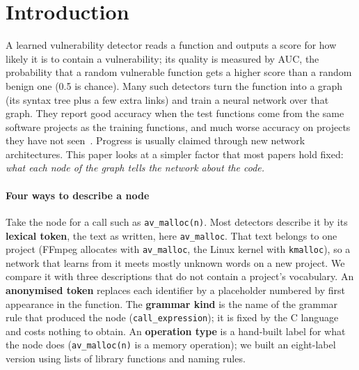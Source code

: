 \section{Introduction}

A learned vulnerability detector reads a function and outputs a score for how
likely it is to contain a vulnerability; its quality is measured by AUC, the
probability that a random vulnerable function gets a higher score than a random
benign one (0.5 is chance). Many such detectors turn the function
into a graph (its syntax tree plus a few extra links) and train a neural
network over that graph. They report good accuracy when the test functions come
from the same software projects as the training functions, and much worse
accuracy on projects they have not seen~\cite{chakraborty2022deep,
chakraborty2024realvul, ding2025primevul}. Progress is usually claimed through
new network architectures. This paper looks at a simpler factor that most
papers hold fixed: \emph{what each node of the graph tells the network about the
code.}

\paragraph{Four ways to describe a node} Take the node for a call such as
\texttt{av\_malloc(n)}. Most detectors describe it by its \textbf{lexical
token}, the text as written, here \texttt{av\_malloc}. That text belongs to one
project (FFmpeg allocates with \texttt{av\_malloc}, the Linux kernel with
\texttt{kmalloc}), so a network that learns from it meets mostly unknown words
on a new project. We compare it with three descriptions that do not contain a
project's vocabulary. An \textbf{anonymised token} replaces each identifier by
a placeholder numbered by first appearance in the function. The \textbf{grammar
kind} is the name of the grammar rule that produced the node
(\texttt{call\_expression}); it is fixed by the C language and costs nothing to
obtain. An \textbf{operation type} is a hand-built label for what the node does
(\texttt{av\_malloc(n)} is a memory operation); we built an eight-label version
using lists of library functions and naming rules.

